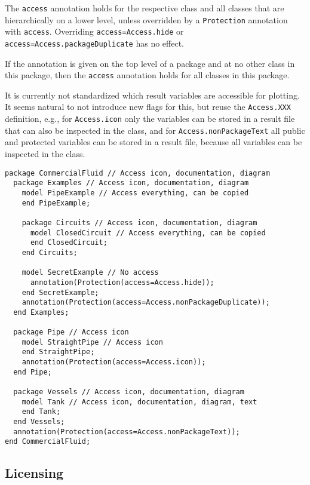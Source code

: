 The \lstinline!access! annotation holds for the respective class and all classes
that are hierarchically on a lower level, unless overridden by a
\lstinline!Protection! annotation with \lstinline!access!.
Overriding \lstinline!access=Access.hide! or \lstinline!access=Access.packageDuplicate!
has no effect.

\begin{example}
If the annotation is given on the top level of a package and at no other class in this package, then the \lstinline!access! annotation holds for all classes in this package.
\end{example}

\begin{nonnormative}
It is currently not standardized which result variables are
accessible for plotting. It seems natural to not introduce new flags for
this, but reuse the \lstinline!Access.XXX! definition, e.g., for \lstinline!Access.icon!
only the variables can be stored in a result file that can also be
inspected in the class, and for \lstinline!Access.nonPackageText! all public
and protected variables can be stored in a result file, because all
variables can be inspected in the class.

\begin{lstlisting}[language=modelica]
package CommercialFluid // Access icon, documentation, diagram
  package Examples // Access icon, documentation, diagram
    model PipeExample // Access everything, can be copied
    end PipeExample;

    package Circuits // Access icon, documentation, diagram
      model ClosedCircuit // Access everything, can be copied
      end ClosedCircuit;
    end Circuits;

    model SecretExample // No access
      annotation(Protection(access=Access.hide));
    end SecretExample;
    annotation(Protection(access=Access.nonPackageDuplicate));
  end Examples;

  package Pipe // Access icon
    model StraightPipe // Access icon
    end StraightPipe;
    annotation(Protection(access=Access.icon));
  end Pipe;

  package Vessels // Access icon, documentation, diagram
    model Tank // Access icon, documentation, diagram, text
    end Tank;
  end Vessels;
  annotation(Protection(access=Access.nonPackageText));
end CommercialFluid;
\end{lstlisting}
\end{nonnormative}

\subsection{Licensing}\label{licensing}

